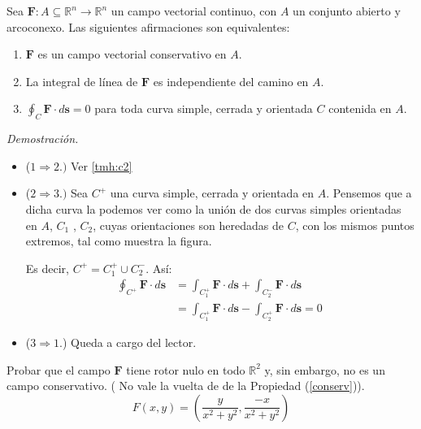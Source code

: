 \begin{theorem}\label{thm:equivalencias_conservativos}
Sea $\mathbf{F}: A \subseteq \mathbb{R}^n \to \mathbb{R}^n$ un campo vectorial continuo, con $A$ un conjunto abierto y arcoconexo. Las siguientes afirmaciones son equivalentes:
\begin{enumerate}
    \item $\mathbf{F}$ es un campo vectorial conservativo en $A$.
    \item La integral de línea de $\mathbf{F}$ es independiente del camino en $A$.
    \item $\oint_C \mathbf{F} \cdot d\mathbf{s} = 0$ para toda curva simple, cerrada y orientada $C$ contenida en $A$.
\end{enumerate}
\end{theorem}

    \textit{Demostración.} 
    \begin{itemize}
\item[] ($1 \Rightarrow 2.)$  Ver \ref{tmh:c2}
\item[] ($2 \Rightarrow 3.)$ Sea $C^{+}$ una curva simple, cerrada y orientada en $A$. Pensemos que a dicha curva la podemos ver como la uni\'on de  dos curvas   simples orientadas en $A$,  $C_1$ , $C_2$,  cuyas orientaciones son heredadas de $C$,   con los mismos puntos extremos,  tal como muestra la figura. 

\begin{figure}[htbp]
    \centering
     
    \label{fig:campo conservativo}
\end{figure}

   Es decir,  $C^{+}=C_1^{+} \cup C_2^{-}$.  Así:
    \begin{align*}
        \oint_{C^{+}} \mathbf{F}\cdot d\mathbf{s}&=\int_{C_1^{+}}\mathbf{F}\cdot d\mathbf{s}+\int_{C_2^{-}}\mathbf{F}\cdot d\mathbf{s}\\
        &=\int_{C_1^{+}}\mathbf{F}\cdot d\mathbf{s}-\int_{C_2^{+}}\mathbf{F}\cdot d\mathbf{s} =0 \ 
          \end{align*}
   \item[] ($3 \Rightarrow 1$.) Queda a cargo del lector.   
\end{itemize}


\begin{tarea}  Probar que el campo $\mathbf{F}$  tiene rotor nulo en todo $\mathbb{R}^{2}$ y, sin embargo, no es un campo conservativo. ( No vale la vuelta de de la Propiedad (\ref{conserv})).   $$F(x,y) = (\dfrac{y}{x^{2}+y^{2}}, \dfrac{-x}{x^{2}+y^{2}}) $$
\end{tarea}



